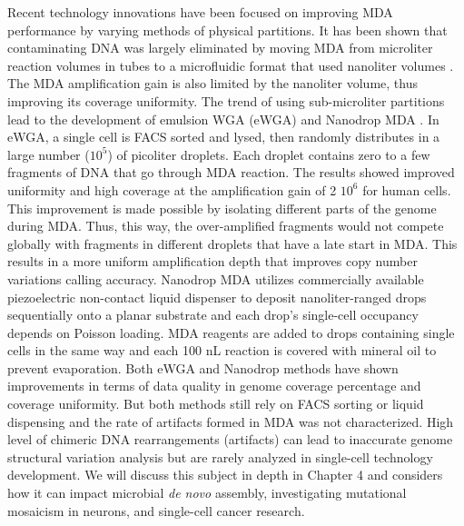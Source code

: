 Recent technology innovations have been focused on improving MDA performance by varying methods of physical partitions. It has been shown that contaminating DNA was largely eliminated by moving MDA from microliter reaction volumes in tubes to a microfluidic format that used nanoliter volumes \cite{deBourcy:2014ji}. The MDA amplification gain is also limited by the nanoliter volume, thus improving its coverage uniformity. The trend of using sub-microliter partitions lead to the development of emulsion WGA (eWGA) \cite{Fu:2015gl} and Nanodrop MDA \cite{Leung:2016vx}. In eWGA, a single cell is FACS sorted and lysed, then randomly distributes in a large number ($10^5$) of picoliter droplets. Each droplet contains zero to a few fragments of DNA that go through MDA reaction. The results showed improved uniformity and high coverage at the amplification gain of 2 \times $10^6$ for human cells. This improvement is made possible by isolating different parts of the genome during MDA. Thus, this way, the over-amplified fragments would not compete globally with fragments in different droplets that have a late start in MDA. This results in a more uniform amplification depth that improves copy number variations calling accuracy. Nanodrop MDA utilizes commercially available piezoelectric non-contact liquid dispenser to deposit nanoliter-ranged drops sequentially onto a planar substrate and each drop's single-cell occupancy depends on Poisson loading. MDA reagents are added to drops containing single cells in the same way and each 100 nL reaction is covered with mineral oil to prevent evaporation. Both eWGA and Nanodrop methods have shown improvements in terms of data quality in genome coverage percentage and coverage uniformity. But both methods still rely on FACS sorting or liquid dispensing and the rate of artifacts formed in MDA was not characterized. High level of chimeric DNA rearrangements (artifacts) can lead to inaccurate genome structural variation analysis but are rarely analyzed in single-cell technology development. We will discuss this subject in depth in Chapter 4 and considers how it can impact microbial \textit{de novo} assembly, investigating mutational mosaicism in neurons, and single-cell cancer research. 


